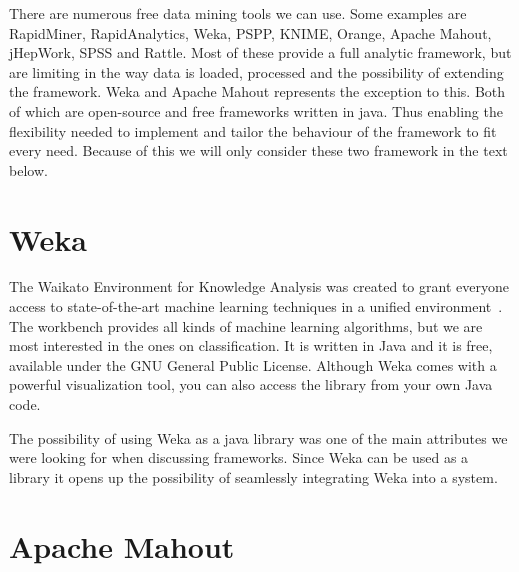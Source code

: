 There are numerous free data mining tools we can use. Some examples are RapidMiner, RapidAnalytics, Weka, PSPP, KNIME, Orange, Apache Mahout, jHepWork, SPSS and Rattle.
Most of these provide a full analytic framework, but are limiting in the way data is loaded, processed and the possibility of extending the framework. 
Weka and Apache Mahout represents the exception to this. Both of which are open-source and free frameworks written in java. 
Thus enabling the flexibility needed to implement and tailor the behaviour of the framework to fit every need.
Because of this we will only consider these two framework in the text below.

\section{Weka}
The Waikato Environment for Knowledge Analysis was created to grant everyone access to state-of-the-art machine learning techniques in a unified environment~\cite{Hall:2009:WDM:1656274.1656278}. 
The workbench provides all kinds of machine learning algorithms, but we are most interested in the ones on classification. 
It is written in Java and it is free, available under the GNU General Public License. 
Although Weka comes with a powerful visualization tool, you can also access the library from your own Java code.

\bigskip\noindent
The possibility of using Weka as a java library was one of the main attributes we were looking for when discussing frameworks.
Since Weka can be used as a library it opens up the possibility of seamlessly integrating Weka into a system.

\section{Apache Mahout}



